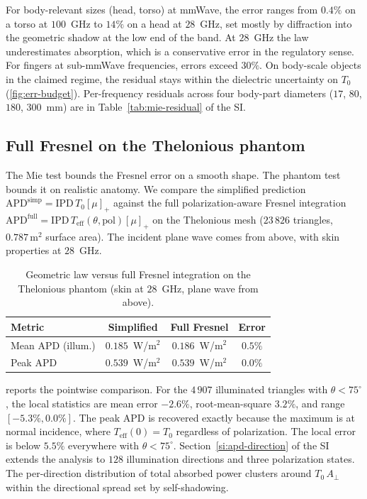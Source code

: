 \documentclass[journal,twocolumn,10pt]{IEEEtran}
\theoremstyle{plain}
\theoremstyle{remark}
\newcommand{\IPD}{\mathrm{IPD}}
\newcommand{\APD}{\mathrm{APD}}
\newcommand{\Aperp}{A_\perp}
\newcommand{\Teff}{T_{\mathrm{eff}}}
\newcommand{\pospart}[1]{\left[#1\right]_{+}}
\begin{document}
For body-relevant sizes (head, torso) at mmWave, the error ranges
from $0.4\%$ on a torso at $100$~GHz to $14\%$ on a head at
$28$~GHz, set mostly by diffraction into the geometric shadow at
the low end of the band. At $28$~GHz the law underestimates
absorption, which is a conservative error in the regulatory sense.
For fingers at sub-mmWave frequencies, errors exceed $30\%$. On
body-scale objects in the claimed regime, the residual stays within
the dielectric uncertainty on $T_0$ (\cref{fig:err-budget}).
Per-frequency residuals across four body-part diameters ($17$, $80$,
$180$, $300$~mm) are in Table~\ref{tab:mie-residual} of the SI.

\subsection{Full Fresnel on the Thelonious phantom}\label{subsec:val-fresnel}
The Mie test bounds the Fresnel error on a smooth shape. The phantom
test bounds it on realistic anatomy. We compare the simplified
prediction $\APD^{\mathrm{simp}} = \IPD\,T_0 \pospart{\mu}$ against
the full polarization-aware Fresnel integration $\APD^{\mathrm{full}}
= \IPD\,\Teff(\theta, \mathrm{pol}) \pospart{\mu}$ on the Thelonious
mesh ($23\,826$ triangles, $0.787\,\mathrm{m}^2$ surface area). The
incident plane wave comes from above, with skin properties at
$28$~GHz.

\begin{table}[!t]
\centering
\caption{Geometric law versus full Fresnel integration on the
Thelonious phantom (skin at $28$~GHz, plane wave from above).}
\label{tab:phantom}
\begin{tabular}{lccc}
\toprule
Metric & Simplified & Full Fresnel & Error \\
\midrule
Mean $\APD$ (illum.)     & $0.185$~W/m$^2$ & $0.186$~W/m$^2$ & $0.5\%$ \\
Peak $\APD$              & $0.539$~W/m$^2$ & $0.539$~W/m$^2$ & $0.0\%$ \\
\bottomrule
\end{tabular}
\end{table}

 reports the pointwise comparison. For the
$4\,907$ illuminated triangles with
$\theta < 75^\circ$, the local statistics are mean error $-2.6\%$,
root-mean-square $3.2\%$, and range $[-5.3\%, 0.0\%]$. The peak
$\APD$ is recovered exactly because the maximum is at normal incidence,
where $\Teff(0) = T_0$ regardless of polarization. The local error is
below $5.5\%$ everywhere with $\theta < 75^\circ$.
Section~\ref{si:apd-direction} of the SI extends the analysis to
$128$ illumination directions and three polarization states. The
per-direction distribution of total absorbed power clusters around
$T_0\,\Aperp$ within the directional spread set by self-shadowing.
\end{document}
